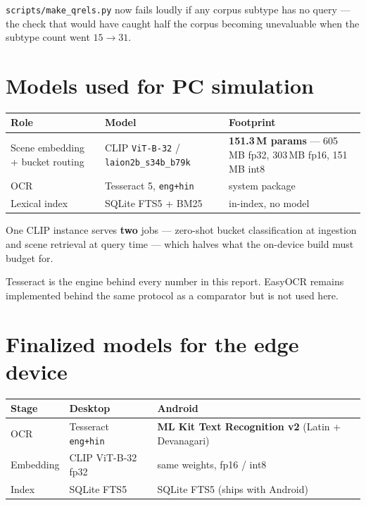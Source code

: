 \documentclass[11pt,a4paper]{article}
\newcommand{\code}[1]{\texttt{\small #1}}
\begin{document}
\code{scripts/make\_qrels.py} now fails loudly if any corpus subtype has no
query --- the check that would have caught half the corpus becoming unevaluable
when the subtype count went $15 \rightarrow 31$.

\section{Models used for PC simulation}

\begin{center}
\begin{tabular}{@{}p{5.2cm}p{4.6cm}p{5.6cm}@{}}
\toprule
\textbf{Role} & \textbf{Model} & \textbf{Footprint} \\
\midrule
Scene embedding + bucket routing & CLIP \code{ViT-B-32} / \code{laion2b\_s34b\_b79k}
  & \textbf{151.3\,M params} --- 605\,MB fp32, 303\,MB fp16, 151\,MB int8 \\
OCR & Tesseract 5, \code{eng+hin} & system package \\
Lexical index & SQLite FTS5 + BM25 & in-index, no model \\
\bottomrule
\end{tabular}
\end{center}

One CLIP instance serves \textbf{two} jobs --- zero-shot bucket classification at
ingestion and scene retrieval at query time --- which halves what the on-device
build must budget for.

Tesseract is the engine behind every number in this report. EasyOCR remains
implemented behind the same protocol as a comparator but is not used here.

\section{Finalized models for the edge device}

\begin{center}
\begin{tabular}{@{}lll@{}}
\toprule
\textbf{Stage} & \textbf{Desktop} & \textbf{Android} \\
\midrule
OCR       & Tesseract \code{eng+hin} & \textbf{ML Kit Text Recognition v2} (Latin + Devanagari) \\
Embedding & CLIP ViT-B-32 fp32       & same weights, fp16 / int8 \\
Index     & SQLite FTS5              & SQLite FTS5 (ships with Android) \\
\bottomrule
\end{tabular}
\end{center}
\end{document}
